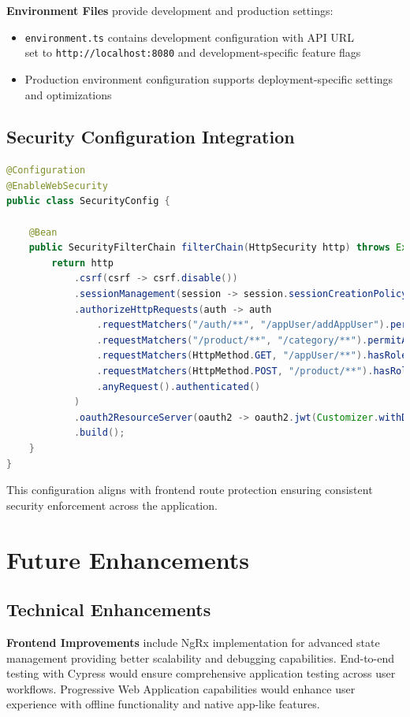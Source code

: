 \documentclass[12pt,a4paper]{article}
\begin{document}
\textbf{Environment Files} provide development and production settings:
\begin{itemize}
    \item \texttt{environment.ts} contains development configuration with API URL\\ set to \texttt{http://localhost:8080} and development-specific feature flags
    \item Production environment configuration supports deployment-specific settings and optimizations
\end{itemize}

\subsection{Security Configuration Integration}

\begin{lstlisting}[language=java,caption=Security Configuration]
@Configuration
@EnableWebSecurity
public class SecurityConfig {

    @Bean
    public SecurityFilterChain filterChain(HttpSecurity http) throws Exception {
        return http
            .csrf(csrf -> csrf.disable())
            .sessionManagement(session -> session.sessionCreationPolicy(STATELESS))
            .authorizeHttpRequests(auth -> auth
                .requestMatchers("/auth/**", "/appUser/addAppUser").permitAll()
                .requestMatchers("/product/**", "/category/**").permitAll()
                .requestMatchers(HttpMethod.GET, "/appUser/**").hasRole("ADMIN")
                .requestMatchers(HttpMethod.POST, "/product/**").hasRole("ADMIN")
                .anyRequest().authenticated()
            )
            .oauth2ResourceServer(oauth2 -> oauth2.jwt(Customizer.withDefaults()))
            .build();
    }
}
\end{lstlisting}

This configuration aligns with frontend route protection ensuring consistent security enforcement across the application.

\section{Future Enhancements}

\subsection{Technical Enhancements}

\textbf{Frontend Improvements} include NgRx implementation for advanced state management providing better scalability and debugging capabilities. End-to-end testing with Cypress would ensure comprehensive application testing across user workflows. Progressive Web Application capabilities would enhance user experience with offline functionality and native app-like features.
\end{document}
